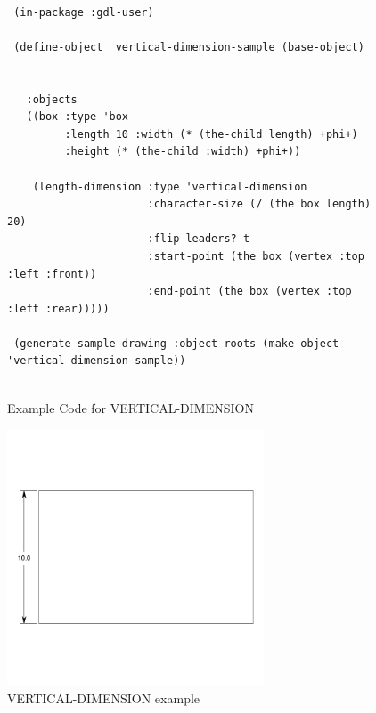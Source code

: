 \documentclass [11pt]{book}
\begin{document}
\begin{itemize}
\begin{figure}
\begin{lrbox}{\boxedverb}
\begin{minipage}{\linewidth}
{\begin{verbatim}        

 (in-package :gdl-user)
                   
 (define-object  vertical-dimension-sample (base-object)
  
  
   :objects
   ((box :type 'box
         :length 10 :width (* (the-child length) +phi+)
         :height (* (the-child :width) +phi+))
   
    (length-dimension :type 'vertical-dimension
                      :character-size (/ (the box length) 20)
                      :flip-leaders? t
                      :start-point (the box (vertex :top :left :front))
                      :end-point (the box (vertex :top :left :rear)))))

 (generate-sample-drawing :object-roots (make-object 'vertical-dimension-sample))


\end{verbatim}}
\end{minipage}
\end{lrbox}
\fbox{\usebox{\boxedverb}}

\caption{Example Code for VERTICAL-DIMENSION}

\label{fig:example-code-VERTICAL-DIMENSION}

\end{figure}

\begin{figure}
\begin{center}
\includegraphics[width=3in,height=3in]{../images/example-vertical-dimension.pdf}
\end{center}

\caption{VERTICAL-DIMENSION example}

\label{fig:VERTICAL-DIMENSION}

\end{figure}






\end{itemize}
\end{document}
